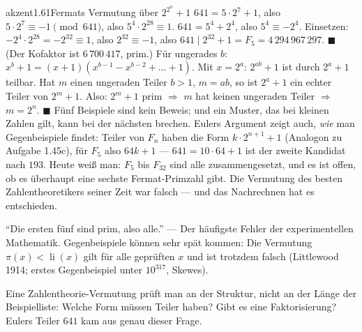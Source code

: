 \begin{loesungkarte}{akzent}{1.61}{Fermats Vermutung über $2^{2^{n}} + 1$}
$641 = 5\cdot2^{7} + 1$, also $5\cdot2^{7}\equiv-1\pmod{641}$, also $5^{4}\cdot2^{28}\equiv1$. $641 = 5^{4} + 2^{4}$, also $5^{4}\equiv-2^{4}$. Einsetzen: $-2^{4}\cdot2^{28} = -2^{32}\equiv1$, also $2^{32}\equiv-1$, also $641\mid2^{32} + 1 = F_5 = 4\,294\,967\,297$. $\blacksquare$ (Der Kofaktor ist $6\,700\,417$, prim.)
Für ungerades $b$: $x^{b} + 1 = (x + 1)(x^{b-1} - x^{b-2} + \dots + 1)$. Mit $x = 2^{a}$: $2^{ab} + 1$ ist durch $2^{a} + 1$ teilbar. Hat $m$ einen ungeraden Teiler $b > 1$, $m = ab$, so ist $2^{a} + 1$ ein echter Teiler von $2^{m} + 1$. Also: $2^{m} + 1$ prim $\Rightarrow$ $m$ hat keinen ungeraden Teiler $\Rightarrow$ $m = 2^{n}$. $\blacksquare$
Fünf Beispiele sind kein Beweis; und ein Muster, das bei kleinen Zahlen gilt, kann bei der nächsten brechen. Eulers Argument zeigt auch, \emph{wie} man Gegenbeispiele findet: Teiler von $F_n$ haben die Form $k\cdot2^{n+1} + 1$ (Analogon zu Aufgabe 1.45c), für $F_5$ also $64k + 1$ --- $641 = 10\cdot64 + 1$ ist der zweite Kandidat nach $193$. Heute weiß man: $F_5$ bis $F_{32}$ sind alle zusammengesetzt, und es ist offen, ob es überhaupt eine sechste Fermat-Primzahl gibt. Die Vermutung des besten Zahlentheoretikers seiner Zeit war falsch --- und das Nachrechnen hat es entschieden.
\begin{fehler}\kastentext
\enquote{Die ersten fünf sind prim, also alle.} --- Der häufigste Fehler der experimentellen Mathematik. Gegenbeispiele können sehr spät kommen: Die Vermutung $\pi(x) < \operatorname{li}(x)$ gilt für alle geprüften $x$ und ist trotzdem falsch (Littlewood 1914; erstes Gegenbeispiel unter $10^{317}$, Skewes).
\end{fehler}
\begin{mitnehmen}\kastentext
Eine Zahlentheorie-Vermutung prüft man an der Struktur, nicht an der Länge der Beispielliste: Welche Form müssen Teiler haben? Gibt es eine Faktorisierung? Eulers Teiler $641$ kam aus genau dieser Frage.
\end{mitnehmen}
\end{loesungkarte}
